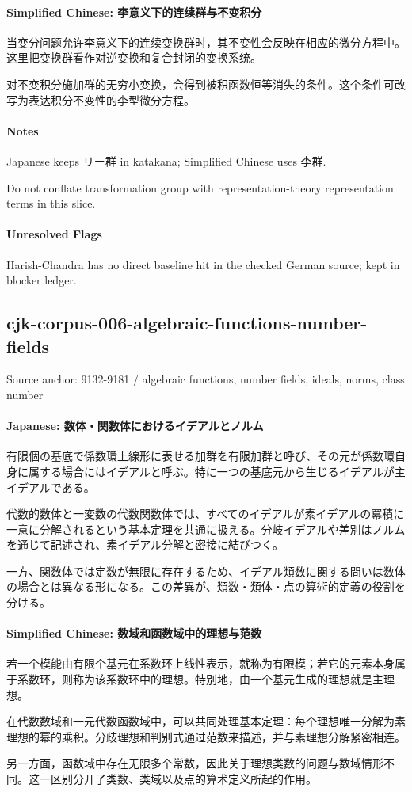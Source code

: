 \documentclass[11pt]{article}
\begin{document}
\paragraph{Simplified Chinese: 李意义下的连续群与不变积分}
当变分问题允许李意义下的连续变换群时，其不变性会反映在相应的微分方程中。这里把变换群看作对逆变换和复合封闭的变换系统。\par
对不变积分施加群的无穷小变换，会得到被积函数恒等消失的条件。这个条件可改写为表达积分不变性的李型微分方程。\par
\paragraph{Notes}
Japanese keeps リー群 in katakana; Simplified Chinese uses 李群.\par
Do not conflate transformation group with representation-theory representation terms in this slice.\par
\paragraph{Unresolved Flags}
Harish-Chandra has no direct baseline hit in the checked German source; kept in blocker ledger.\par
\subsection*{cjk-corpus-006-algebraic-functions-number-fields}
Source anchor: 9132-9181 / algebraic functions, number fields, ideals, norms, class number
\par
\paragraph{Japanese: 数体・関数体におけるイデアルとノルム}
有限個の基底で係数環上線形に表せる加群を有限加群と呼び、その元が係数環自身に属する場合にはイデアルと呼ぶ。特に一つの基底元から生じるイデアルが主イデアルである。\par
代数的数体と一変数の代数関数体では、すべてのイデアルが素イデアルの冪積に一意に分解されるという基本定理を共通に扱える。分岐イデアルや差別はノルムを通じて記述され、素イデアル分解と密接に結びつく。\par
一方、関数体では定数が無限に存在するため、イデアル類数に関する問いは数体の場合とは異なる形になる。この差異が、類数・類体・点の算術的定義の役割を分ける。\par
\paragraph{Simplified Chinese: 数域和函数域中的理想与范数}
若一个模能由有限个基元在系数环上线性表示，就称为有限模；若它的元素本身属于系数环，则称为该系数环中的理想。特别地，由一个基元生成的理想就是主理想。\par
在代数数域和一元代数函数域中，可以共同处理基本定理：每个理想唯一分解为素理想的幂的乘积。分歧理想和判别式通过范数来描述，并与素理想分解紧密相连。\par
另一方面，函数域中存在无限多个常数，因此关于理想类数的问题与数域情形不同。这一区别分开了类数、类域以及点的算术定义所起的作用。\par
\end{document}
